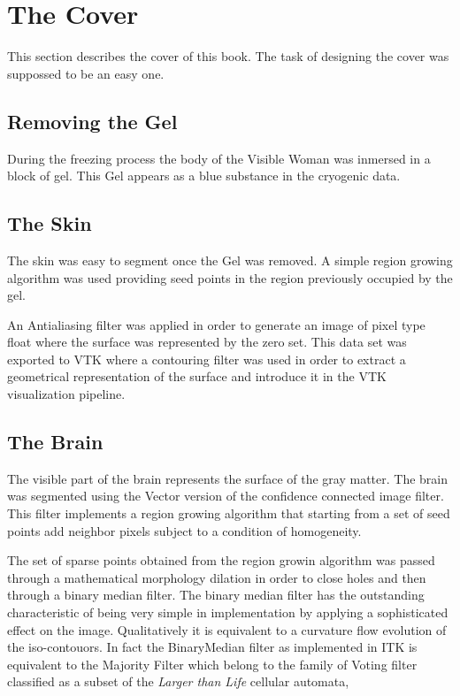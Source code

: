 \chapter*{The Cover}

This section describes the cover of this book. The task of designing the cover
was suppossed to be an easy one. 

\section*{Removing the Gel}
During the freezing process the body of the Visible Woman was inmersed in a
block of gel. This Gel appears as a blue substance in the cryogenic data.

\section*{The Skin}
The skin was easy to segment once the Gel was removed. A simple region growing
algorithm was used providing seed points in the region previously occupied by
the gel. 

An Antialiasing filter was applied in order to generate an image of pixel type
float where the surface was represented by the zero set. This data set was
exported to VTK where a contouring filter was used in order to extract a
geometrical representation of the surface and introduce it in the VTK
visualization pipeline.


\section*{The Brain}
The visible part of the brain represents the surface of the gray matter.  The
brain was segmented using the Vector version of the confidence connected image
filter.  This filter implements a region growing algorithm that starting from a
set of seed points add neighbor pixels subject to a condition of homogeneity.

The set of sparse points obtained from the region growin algorithm was passed
through a mathematical morphology dilation in order to close holes and then
through a binary median filter. The binary median filter has the outstanding
characteristic of being very simple in implementation by applying a
sophisticated effect on the image. Qualitatively it is equivalent to a
curvature flow evolution of the iso-contouors. In fact the BinaryMedian filter
as implemented in ITK is equivalent to the Majority Filter which belong to the
family of Voting filter classified as a subset of the \emph{Larger than Life}
cellular automata, 

